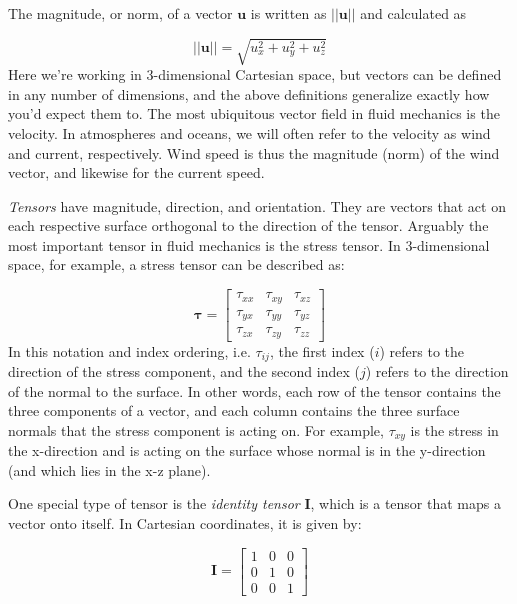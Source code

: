 \documentclass[12pt]{article}
\numberwithin{equation}{section}
\numberwithin{figure}{section}
\numberwithin{table}{section}
\begin{document}
The magnitude, or norm, of a vector 
$\mathbf{u}$ is written as $||\mathbf{u}||$ and calculated as

\begin{equation}
  ||\mathbf{u}|| = \sqrt{u_x^2 + u_y^2 + u_z^2}
\end{equation}
Here we're working in 3-dimensional Cartesian space, but vectors can be defined
in any number of dimensions, and the above definitions generalize exactly how
you'd expect them to.
The most ubiquitous vector field in fluid mechanics is the velocity.
In atmospheres and oceans, we will often refer to the velocity as wind and
current, respectively.
Wind speed is thus the magnitude (norm) of the wind vector, and likewise for
the current speed.

\textit{Tensors} have magnitude, direction, and orientation.
They are vectors that act on each respective surface orthogonal to the direction
of the tensor.
Arguably the most important tensor in fluid mechanics is the stress tensor.
In 3-dimensional space, for example, a stress tensor can be described as:

\begin{equation}
  \boldsymbol{\tau} =
  \begin{bmatrix}
    \tau_{xx} & \tau_{xy} & \tau_{xz} \\
    \tau_{yx} & \tau_{yy} & \tau_{yz} \\
    \tau_{zx} & \tau_{zy} & \tau_{zz}
  \end{bmatrix}
\end{equation}
In this notation and index ordering, i.e. $\tau_{ij}$, the first index ($i$)
refers to the direction of the stress component, and the second index ($j$)
refers to the direction of the normal to the surface.
In other words, each row of the tensor contains the three components of a
vector, and each column contains the three surface normals that the stress
component is acting on.
For example, $\tau_{xy}$ is the stress in the x-direction and is acting on the
surface whose normal is in the y-direction (and which lies in the x-z plane).

One special type of tensor is the \textit{identity tensor}
$\mathbf{I}$, which is a tensor that maps a vector onto itself.
In Cartesian coordinates, it is given by:

\begin{equation}
  \mathbf{I} =
  \begin{bmatrix}
    1 & 0 & 0 \\
    0 & 1 & 0 \\
    0 & 0 & 1
  \end{bmatrix}
\end{equation}
\end{document}
